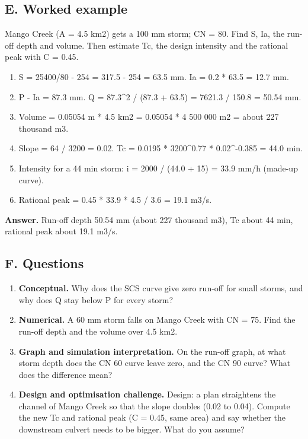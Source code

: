 \documentclass[11pt,a4paper]{article}
\begin{document}
\subsection*{E. Worked example}
Mango Creek (A = 4.5 km2) gets a 100 mm storm; CN = 80. Find S, Ia, the run-off depth and volume. Then estimate Tc, the design intensity and the rational peak with C = 0.45.
\begin{enumerate}[nosep]
\item S = 25400/80 - 254 = 317.5 - 254 = 63.5 mm. Ia = 0.2 * 63.5 = 12.7 mm.
\item P - Ia = 87.3 mm. Q = 87.3\textasciicircum{}2 / (87.3 + 63.5) = 7621.3 / 150.8 = 50.54 mm.
\item Volume = 0.05054 m * 4.5 km2 = 0.05054 * 4 500 000 m2 = about 227 thousand m3.
\item Slope = 64 / 3200 = 0.02. Tc = 0.0195 * 3200\textasciicircum{}0.77 * 0.02\textasciicircum{}-0.385 = 44.0 min.
\item Intensity for a 44 min storm: i = 2000 / (44.0 + 15) = 33.9 mm/h (made-up curve).
\item Rational peak = 0.45 * 33.9 * 4.5 / 3.6 = 19.1 m3/s.
\end{enumerate}
\textbf{Answer.} Run-off depth 50.54 mm (about 227 thousand m3), Tc about 44 min, rational peak about 19.1 m3/s.

\subsection*{F. Questions}
\begin{enumerate}[nosep]
\item \textbf{Conceptual.} Why does the SCS curve give zero run-off for small storms, and why does Q stay below P for every storm?
\item \textbf{Numerical.} A 60 mm storm falls on Mango Creek with CN = 75. Find the run-off depth and the volume over 4.5 km2.
\item \textbf{Graph and simulation interpretation.} On the run-off graph, at what storm depth does the CN 60 curve leave zero, and the CN 90 curve? What does the difference mean?
\item \textbf{Design and optimisation challenge.} Design: a plan straightens the channel of Mango Creek so that the slope doubles (0.02 to 0.04). Compute the new Tc and rational peak (C = 0.45, same area) and say whether the downstream culvert needs to be bigger. What do you assume?
\end{enumerate}
\end{document}
